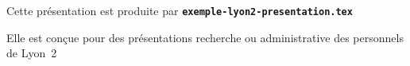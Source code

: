   \item Cette présentation est produite par \texttt{\textbf{exemple-lyon2-presentation.tex}}
  \item Elle est conçue pour des présentations recherche ou administrative des personnels de Lyon~2
